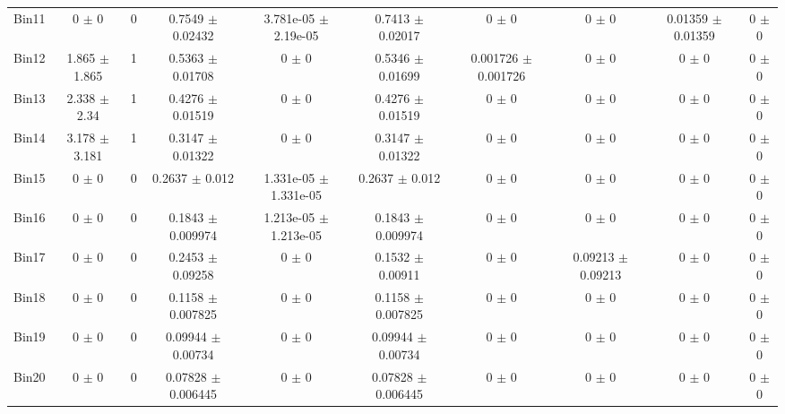 \begin{tabular}{@{\extracolsep{4pt}}lccccccccc@{}}
     Bin11 & 0 $\pm$ 0 & 0 & 0.7549 $\pm$ 0.02432 & 3.781e-05 $\pm$ 2.19e-05 & 0.7413 $\pm$ 0.02017 & 0 $\pm$ 0 & 0 $\pm$ 0 & 0.01359 $\pm$ 0.01359 & 0 $\pm$ 0 \\ 
     Bin12 & 1.865 $\pm$ 1.865 & 1 & 0.5363 $\pm$ 0.01708 & 0 $\pm$ 0 & 0.5346 $\pm$ 0.01699 & 0.001726 $\pm$ 0.001726 & 0 $\pm$ 0 & 0 $\pm$ 0 & 0 $\pm$ 0 \\ 
     Bin13 & 2.338 $\pm$ 2.34 & 1 & 0.4276 $\pm$ 0.01519 & 0 $\pm$ 0 & 0.4276 $\pm$ 0.01519 & 0 $\pm$ 0 & 0 $\pm$ 0 & 0 $\pm$ 0 & 0 $\pm$ 0 \\ 
     Bin14 & 3.178 $\pm$ 3.181 & 1 & 0.3147 $\pm$ 0.01322 & 0 $\pm$ 0 & 0.3147 $\pm$ 0.01322 & 0 $\pm$ 0 & 0 $\pm$ 0 & 0 $\pm$ 0 & 0 $\pm$ 0 \\ 
     Bin15 & 0 $\pm$ 0 & 0 & 0.2637 $\pm$ 0.012 & 1.331e-05 $\pm$ 1.331e-05 & 0.2637 $\pm$ 0.012 & 0 $\pm$ 0 & 0 $\pm$ 0 & 0 $\pm$ 0 & 0 $\pm$ 0 \\ 
     Bin16 & 0 $\pm$ 0 & 0 & 0.1843 $\pm$ 0.009974 & 1.213e-05 $\pm$ 1.213e-05 & 0.1843 $\pm$ 0.009974 & 0 $\pm$ 0 & 0 $\pm$ 0 & 0 $\pm$ 0 & 0 $\pm$ 0 \\ 
     Bin17 & 0 $\pm$ 0 & 0 & 0.2453 $\pm$ 0.09258 & 0 $\pm$ 0 & 0.1532 $\pm$ 0.00911 & 0 $\pm$ 0 & 0.09213 $\pm$ 0.09213 & 0 $\pm$ 0 & 0 $\pm$ 0 \\ 
     Bin18 & 0 $\pm$ 0 & 0 & 0.1158 $\pm$ 0.007825 & 0 $\pm$ 0 & 0.1158 $\pm$ 0.007825 & 0 $\pm$ 0 & 0 $\pm$ 0 & 0 $\pm$ 0 & 0 $\pm$ 0 \\ 
     Bin19 & 0 $\pm$ 0 & 0 & 0.09944 $\pm$ 0.00734 & 0 $\pm$ 0 & 0.09944 $\pm$ 0.00734 & 0 $\pm$ 0 & 0 $\pm$ 0 & 0 $\pm$ 0 & 0 $\pm$ 0 \\ 
     Bin20 & 0 $\pm$ 0 & 0 & 0.07828 $\pm$ 0.006445 & 0 $\pm$ 0 & 0.07828 $\pm$ 0.006445 & 0 $\pm$ 0 & 0 $\pm$ 0 & 0 $\pm$ 0 & 0 $\pm$ 0 \\ 
\hline\hline
  \end{tabular}

